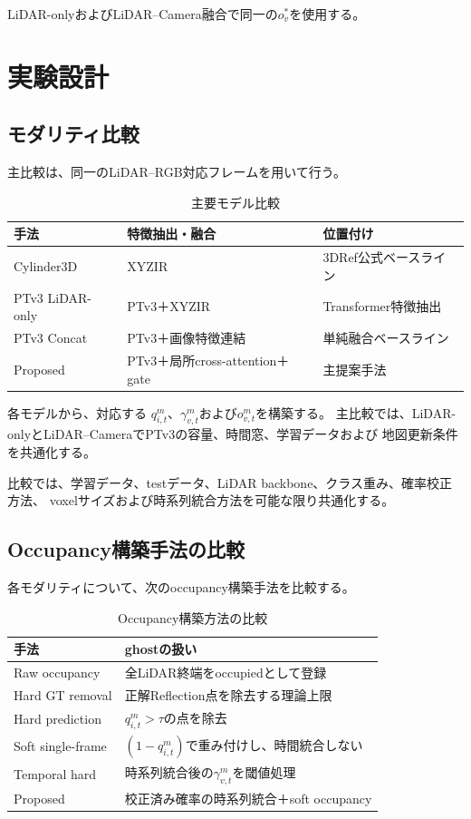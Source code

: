 \documentclass[uplatex,a4paper,11pt]{jsarticle}
\begin{document}
LiDAR-onlyおよびLiDAR--Camera融合で同一の$o_v^{*}$を使用する。

\section{実験設計}

\subsection{モダリティ比較}

主比較は、同一のLiDAR--RGB対応フレームを用いて行う。

\begin{table}[h]
  \centering
  \caption{主要モデル比較}
  \begin{tabular}{lll}
    \toprule
    手法 & 特徴抽出・融合 & 位置付け \\
    \midrule
    Cylinder3D
      & XYZIR
      & 3DRef公式ベースライン \\
    PTv3 LiDAR-only
      & PTv3＋XYZIR
      & Transformer特徴抽出 \\
    PTv3 Concat
      & PTv3＋画像特徴連結
      & 単純融合ベースライン \\
    Proposed
      & PTv3＋局所cross-attention＋gate
      & 主提案手法 \\
    \bottomrule
  \end{tabular}
\end{table}

各モデルから、対応する
$q_{i,t}^{m}$、$\gamma_{v,t}^{m}$および$o_{v,t}^{m}$を構築する。
主比較では、LiDAR-onlyとLiDAR--CameraでPTv3の容量、時間窓、学習データおよび
地図更新条件を共通化する。

比較では、学習データ、testデータ、LiDAR backbone、クラス重み、確率校正方法、
voxelサイズおよび時系列統合方法を可能な限り共通化する。

\subsection{Occupancy構築手法の比較}

各モダリティについて、次のoccupancy構築手法を比較する。

\begin{table}[h]
  \centering
  \caption{Occupancy構築方法の比較}
  \begin{tabular}{ll}
    \toprule
    手法 & ghostの扱い \\
    \midrule
    Raw occupancy
      & 全LiDAR終端をoccupiedとして登録 \\
    Hard GT removal
      & 正解Reflection点を除去する理論上限 \\
    Hard prediction
      & $q_{i,t}^{m}>\tau$の点を除去 \\
    Soft single-frame
      & $(1-q_{i,t}^{m})$で重み付けし、時間統合しない \\
    Temporal hard
      & 時系列統合後の$\gamma_{v,t}^{m}$を閾値処理 \\
    Proposed
      & 校正済み確率の時系列統合＋soft occupancy \\
    \bottomrule
  \end{tabular}
\end{table}
\end{document}
